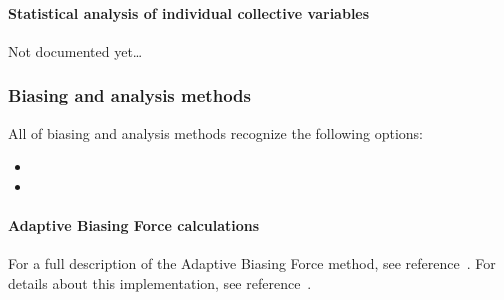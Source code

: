 \begin{itemize}

\end{itemize}



\paragraph*{Statistical analysis of individual collective variables}
\label{sec:colvar_acf}

Not documented yet\ldots


\subsubsection{Biasing and analysis methods}
\label{sec:colvarbias}

All of biasing and analysis methods recognize the following
options:
\begin{itemize}
\item %
\item %
\end{itemize}


\paragraph*{Adaptive Biasing Force calculations}
\label{sec:colvarbias_abf}

For a full description of the Adaptive Biasing Force method, see
reference~\cite{Darve2008}. For details about this implementation,
see reference~\cite{Henin2004}.

